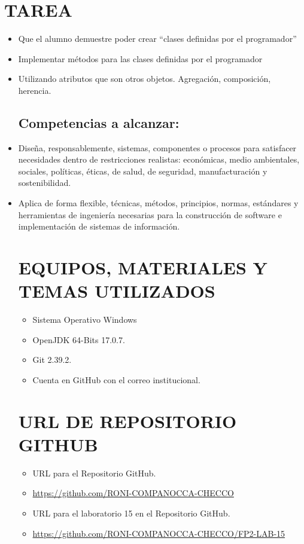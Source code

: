 \documentclass{article}
\begin{document}
    \section{TAREA}
	\begin{itemize}	
    \subsection{Objetivos:}
		\item Que el alumno demuestre poder crear “clases definidas por el programador”
		\item Implementar métodos para las clases definidas por el programador
        \item Utilizando atributos que son otros objetos. Agregación, composición, herencia.
       
    \subsection{Competencias a alcanzar:}
		\item Diseña, responsablemente, sistemas, componentes o procesos para satisfacer necesidades dentro de restricciones realistas: económicas, medio ambientales, sociales, políticas, éticas, de salud, de seguridad, manufacturación y sostenibilidad. 
        \item Aplica de forma flexible, técnicas, métodos, principios, normas, estándares y herramientas de ingeniería necesarias para la construcción de software e implementación de sistemas de información.

    \section{EQUIPOS, MATERIALES Y TEMAS UTILIZADOS}
	\begin{itemize}
		\item Sistema Operativo Windows
		\item OpenJDK 64-Bits 17.0.7.
		\item Git 2.39.2.	
  	\item Cuenta en GitHub con el correo institucional.
	\end{itemize}

    \section{URL DE REPOSITORIO GITHUB}
	\begin{itemize}
		\item URL para el Repositorio GitHub.
		\item \url{https://github.com/RONI-COMPANOCCA-CHECCO}
		\item URL para el laboratorio 15 en el Repositorio GitHub.	
        \item \url{https://github.com/RONI-COMPANOCCA-CHECCO/FP2-LAB-15}
	\end{itemize}


\end{itemize}
\end{document}
